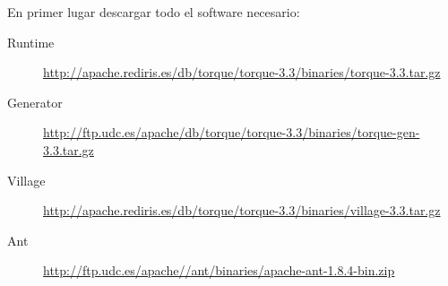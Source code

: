 En primer lugar descargar todo el software necesario:

\begin{description}
	\item[Runtime] \url{http://apache.rediris.es/db/torque/torque-3.3/binaries/torque-3.3.tar.gz}
	\item[Generator] \url{http://ftp.udc.es/apache/db/torque/torque-3.3/binaries/torque-gen-3.3.tar.gz}
	\item[Village] \url{http://apache.rediris.es/db/torque/torque-3.3/binaries/village-3.3.tar.gz}
	\item[Ant] \url{http://ftp.udc.es/apache//ant/binaries/apache-ant-1.8.4-bin.zip}
\end{description}